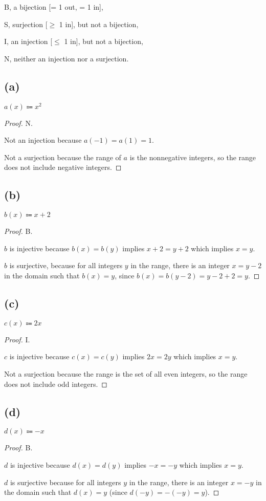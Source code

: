 \documentclass[14pt]{extarticle}
\begin{document}
B, a bijection [= 1 out, = 1 in],

S, surjection [$\geq$ 1 in], but not a bijection,

I, an injection [$\leq$ 1 in], but not a bijection,

N, neither an injection nor a surjection.
\subsection{(a)}
$a(x) \Coloneqq x^2$
\begin{proof}
N.

Not an injection because $a(-1) = a(1) = 1$. 

Not a surjection because the range of $a$ is the nonnegative integers, so the range does not include negative integers.
\end{proof}
\subsection{(b)}
$b(x) \Coloneqq x+2$
\begin{proof}
B.

$b$ is injective because $b(x) = b(y)$ implies $x + 2 = y + 2$ which implies $x = y$.

$b$ is surjective, because for all integers $y$ in the range, there is an integer $x = y - 2$ in the domain such that $b(x) = y$, since $b(x) = b(y - 2) = y-2+2 = y$.
\end{proof}
\subsection{(c)}
$c(x) \Coloneqq 2x$
\begin{proof}
I.

$c$ is injective because $c(x) = c(y)$ implies $2x = 2y$ which implies $x = y$.

Not a surjection because the range is the set of all even integers, so the range does not include odd integers.
\end{proof}
\subsection{(d)}
$d(x) \Coloneqq -x$
\begin{proof}
B.

$d$ is injective because $d(x) = d(y)$ implies $-x = -y$ which implies $x = y$.

$d$ is surjective because for all integers $y$ in the range, there is an integer $x = -y$ in the domain such that $d(x) = y$ (since $d(-y) = -(-y) = y$).
\end{proof}
\end{document}
